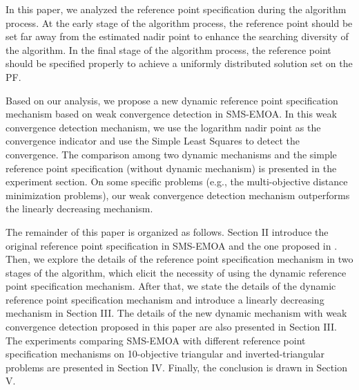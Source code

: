 \documentclass[conference]{IEEEtran}
\begin{document}
In this paper, we analyzed the reference point specification during the algorithm process.
At the early stage of the algorithm process, 
the reference point should be set far away from the estimated nadir point to enhance the searching diversity of the algorithm. 
In the final stage of the algorithm process, 
the reference point should be specified properly to achieve a uniformly distributed solution set on the PF.

Based on our analysis, we propose a new dynamic reference point specification mechanism based on weak convergence detection in SMS-EMOA. 
In this weak convergence detection mechanism, we use the logarithm nadir point as the convergence indicator
and use the Simple Least Squares\cite{SimpleLeastSquares} to detect the convergence. 
The comparison among two dynamic mechanisms and the simple reference point specification (without dynamic mechanism) is 
presented in the experiment section. On some specific problems (e.g., the multi-objective distance minimization problems\cite{dmp}), 
our weak convergence detection mechanism outperforms the linearly decreasing mechanism. 

The remainder of this paper is organized as follows. 
Section II introduce the original reference point specification in SMS-EMOA and the one proposed in \cite{hisao:RPhowtoSpecify}. 
Then, we explore the details of the reference point specification mechanism in two stages of the algorithm, 
which elicit the necessity of using the dynamic reference point specification mechanism. 
After that, we state the details of the dynamic reference point specification mechanism and introduce 
a linearly decreasing mechanism in Section III. 
The details of the new dynamic mechanism with weak convergence detection proposed in this paper are also presented in Section III. 
The experiments comparing SMS-EMOA with different reference point specification mechanisms 
on 10-objective triangular and inverted-triangular problems are presented in Section IV. 
Finally, the conclusion is drawn in Section V.

%
%
\end{document}
